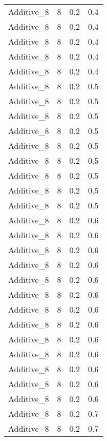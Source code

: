 \documentclass{article}
\begin{document}
\begin{longtable}[H]{lrrr}
 Additive\_8 &       8 &   0.2 &            0.4 \\
 Additive\_8 &       8 &   0.2 &            0.4 \\
 Additive\_8 &       8 &   0.2 &            0.4 \\
 Additive\_8 &       8 &   0.2 &            0.4 \\
 Additive\_8 &       8 &   0.2 &            0.4 \\
 Additive\_8 &       8 &   0.2 &            0.5 \\
 Additive\_8 &       8 &   0.2 &            0.5 \\
 Additive\_8 &       8 &   0.2 &            0.5 \\
 Additive\_8 &       8 &   0.2 &            0.5 \\
 Additive\_8 &       8 &   0.2 &            0.5 \\
 Additive\_8 &       8 &   0.2 &            0.5 \\
 Additive\_8 &       8 &   0.2 &            0.5 \\
 Additive\_8 &       8 &   0.2 &            0.5 \\
 Additive\_8 &       8 &   0.2 &            0.5 \\
 Additive\_8 &       8 &   0.2 &            0.6 \\
 Additive\_8 &       8 &   0.2 &            0.6 \\
 Additive\_8 &       8 &   0.2 &            0.6 \\
 Additive\_8 &       8 &   0.2 &            0.6 \\
 Additive\_8 &       8 &   0.2 &            0.6 \\
 Additive\_8 &       8 &   0.2 &            0.6 \\
 Additive\_8 &       8 &   0.2 &            0.6 \\
 Additive\_8 &       8 &   0.2 &            0.6 \\
 Additive\_8 &       8 &   0.2 &            0.6 \\
 Additive\_8 &       8 &   0.2 &            0.6 \\
 Additive\_8 &       8 &   0.2 &            0.6 \\
 Additive\_8 &       8 &   0.2 &            0.6 \\
 Additive\_8 &       8 &   0.2 &            0.6 \\
 Additive\_8 &       8 &   0.2 &            0.7 \\
 Additive\_8 &       8 &   0.2 &            0.7 \\

\end{longtable}
\end{document}
